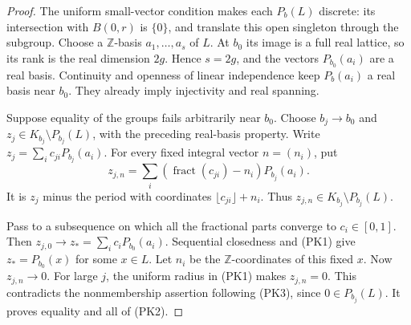 \begin{proof}
The uniform small-vector condition makes each \(P_b(L)\)
discrete: its intersection with \(B(0,r)\) is \(\{0\}\),
and translate this open singleton through the subgroup.
Choose a \(\mathbb Z\)-basis \(a_1,\ldots,a_s\) of \(L\).
At \(b_0\) its image is a full real lattice, so its rank
is the real dimension \(2g\).
Hence \(s=2g\), and the vectors \(P_{b_0}(a_i)\) are a
real basis.
Continuity and openness of linear independence keep
\(P_b(a_i)\) a real basis near \(b_0\).
They already imply injectivity and real spanning.

Suppose equality of the groups fails arbitrarily near \(b_0\).
Choose \(b_j\to b_0\) and
\(z_j\in K_{b_j}\setminus P_{b_j}(L)\), with the preceding
real-basis property.
Write \(z_j=\sum_i c_{ji}P_{b_j}(a_i)\).
For every fixed integral vector \(n=(n_i)\), put
\[
 z_{j,n}=\sum_i(\operatorname{fract}(c_{ji})-n_i)P_{b_j}(a_i).
                                                               \tag{PK3}
\]
It is \(z_j\) minus the period with coordinates
\(\lfloor c_{ji}\rfloor+n_i\).
Thus \(z_{j,n}\in K_{b_j}\setminus P_{b_j}(L)\).

Pass to a subsequence on which all the fractional parts
converge to \(c_i\in[0,1]\).
Then \(z_{j,0}\to z_*=\sum_i c_iP_{b_0}(a_i)\).
Sequential closedness and (PK1) give \(z_*=P_{b_0}(x)\)
for some \(x\in L\).
Let \(n_i\) be the \(\mathbb Z\)-coordinates of this fixed \(x\).
Now \(z_{j,n}\to0\).
For large \(j\), the uniform radius in (PK1) makes
\(z_{j,n}=0\).
This contradicts the nonmembership assertion following
(PK3), since \(0\in P_{b_j}(L)\).
It proves equality and all of (PK2).
\end{proof}

